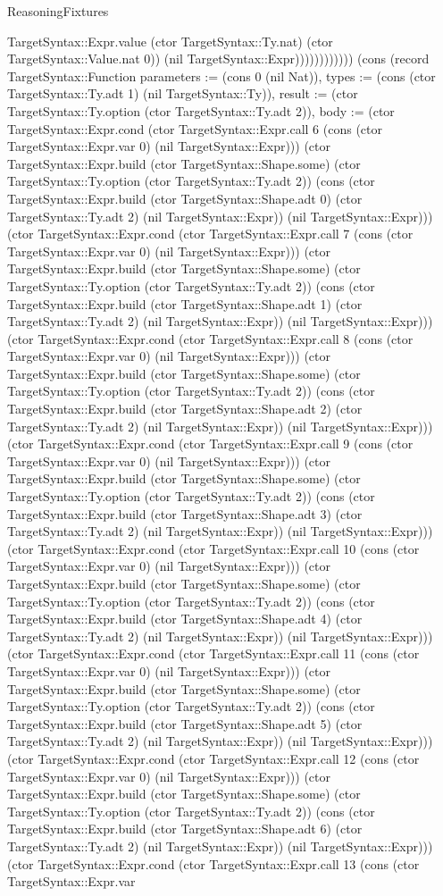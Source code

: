 \begin{lexlean}{ReasoningFixtures}
\begin{semanticmodule}
{TargetSyntax::Expr.value (ctor TargetSyntax::Ty.nat) (ctor TargetSyntax::Value.nat 0)) (nil TargetSyntax::Expr)))))))))))}) (cons (record TargetSyntax::Function {parameters := (cons 0 (nil Nat)), types := (cons (ctor TargetSyntax::Ty.adt 1) (nil TargetSyntax::Ty)), result := (ctor TargetSyntax::Ty.option (ctor TargetSyntax::Ty.adt 2)), body := (ctor TargetSyntax::Expr.cond (ctor TargetSyntax::Expr.call 6 (cons (ctor TargetSyntax::Expr.var 0) (nil TargetSyntax::Expr))) (ctor TargetSyntax::Expr.build (ctor TargetSyntax::Shape.some) (ctor TargetSyntax::Ty.option (ctor TargetSyntax::Ty.adt 2)) (cons (ctor TargetSyntax::Expr.build (ctor TargetSyntax::Shape.adt 0) (ctor TargetSyntax::Ty.adt 2) (nil TargetSyntax::Expr)) (nil TargetSyntax::Expr))) (ctor TargetSyntax::Expr.cond (ctor TargetSyntax::Expr.call 7 (cons (ctor TargetSyntax::Expr.var 0) (nil TargetSyntax::Expr))) (ctor TargetSyntax::Expr.build (ctor TargetSyntax::Shape.some) (ctor TargetSyntax::Ty.option (ctor TargetSyntax::Ty.adt 2)) (cons (ctor TargetSyntax::Expr.build (ctor TargetSyntax::Shape.adt 1) (ctor TargetSyntax::Ty.adt 2) (nil TargetSyntax::Expr)) (nil TargetSyntax::Expr))) (ctor TargetSyntax::Expr.cond (ctor TargetSyntax::Expr.call 8 (cons (ctor TargetSyntax::Expr.var 0) (nil TargetSyntax::Expr))) (ctor TargetSyntax::Expr.build (ctor TargetSyntax::Shape.some) (ctor TargetSyntax::Ty.option (ctor TargetSyntax::Ty.adt 2)) (cons (ctor TargetSyntax::Expr.build (ctor TargetSyntax::Shape.adt 2) (ctor TargetSyntax::Ty.adt 2) (nil TargetSyntax::Expr)) (nil TargetSyntax::Expr))) (ctor TargetSyntax::Expr.cond (ctor TargetSyntax::Expr.call 9 (cons (ctor TargetSyntax::Expr.var 0) (nil TargetSyntax::Expr))) (ctor TargetSyntax::Expr.build (ctor TargetSyntax::Shape.some) (ctor TargetSyntax::Ty.option (ctor TargetSyntax::Ty.adt 2)) (cons (ctor TargetSyntax::Expr.build (ctor TargetSyntax::Shape.adt 3) (ctor TargetSyntax::Ty.adt 2) (nil TargetSyntax::Expr)) (nil TargetSyntax::Expr))) (ctor TargetSyntax::Expr.cond (ctor TargetSyntax::Expr.call 10 (cons (ctor TargetSyntax::Expr.var 0) (nil TargetSyntax::Expr))) (ctor TargetSyntax::Expr.build (ctor TargetSyntax::Shape.some) (ctor TargetSyntax::Ty.option (ctor TargetSyntax::Ty.adt 2)) (cons (ctor TargetSyntax::Expr.build (ctor TargetSyntax::Shape.adt 4) (ctor TargetSyntax::Ty.adt 2) (nil TargetSyntax::Expr)) (nil TargetSyntax::Expr))) (ctor TargetSyntax::Expr.cond (ctor TargetSyntax::Expr.call 11 (cons (ctor TargetSyntax::Expr.var 0) (nil TargetSyntax::Expr))) (ctor TargetSyntax::Expr.build (ctor TargetSyntax::Shape.some) (ctor TargetSyntax::Ty.option (ctor TargetSyntax::Ty.adt 2)) (cons (ctor TargetSyntax::Expr.build (ctor TargetSyntax::Shape.adt 5) (ctor TargetSyntax::Ty.adt 2) (nil TargetSyntax::Expr)) (nil TargetSyntax::Expr))) (ctor TargetSyntax::Expr.cond (ctor TargetSyntax::Expr.call 12 (cons (ctor TargetSyntax::Expr.var 0) (nil TargetSyntax::Expr))) (ctor TargetSyntax::Expr.build (ctor TargetSyntax::Shape.some) (ctor TargetSyntax::Ty.option (ctor TargetSyntax::Ty.adt 2)) (cons (ctor TargetSyntax::Expr.build (ctor TargetSyntax::Shape.adt 6) (ctor TargetSyntax::Ty.adt 2) (nil TargetSyntax::Expr)) (nil TargetSyntax::Expr))) (ctor TargetSyntax::Expr.cond (ctor TargetSyntax::Expr.call 13 (cons (ctor TargetSyntax::Expr.var }
\end{semanticmodule}
\end{lexlean}

